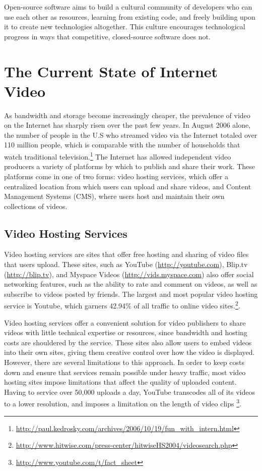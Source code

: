 \documentclass[a4paper,12pt]{report}
\begin{document}
Open-source software aims to build a cultural community of developers who can use each other as resources, learning from existing code, and freely building upon it to create new technologies altogether.
This culture encourages technological progress in ways that competitive, closed-source software does not. 

\section{The Current State of Internet Video}
As bandwidth and storage become increasingly cheaper, the prevalence of video on the Internet has sharply risen over the past few years. 
In August 2006 alone, the number of people in the U.S who streamed video 
via the Internet totaled over 110 million people, which is comparable 
with the number of households that watch traditional television.\footnote{\url{http://paul.kedrosky.com/archives/2006/10/19/fun\_with\_intern.html}}
The Internet has allowed independent video producers a variety of platforms by which to publish and share their work. These platforms come 
in one of two forms: video hosting services, which offer a centralized location from which users can upload and share videos, and Content Management Systems (CMS), where users host and maintain their own collections of videos.

\subsection{Video Hosting Services}
Video hosting services are sites that offer free hosting and sharing of video files that users upload.
These sites, such as YouTube (\url{http://youtube.com}), Blip.tv (\url{http://blip.tv}), and Myspace Videos (\url{http://vids.myspace.com}) also offer social networking features, such as the ability to rate and comment on videos, as well as subscribe to videos posted by friends.
The largest and most popular video hosting service is Youtube, which garners 42.94\% of all traffic to online video sites.\footnote{\url{http://www.hitwise.com/press-center/hitwiseHS2004/videosearch.php}}. 

Video hosting services offer a convenient solution for video publishers 
to share videos with little technical expertise or resources, since bandwidth and hosting costs are shouldered by the service. These sites also allow users to embed videos into their own sites, giving them creative control over how the video is displayed. However, there are several limitations to this approach. In order to keep costs down and ensure that services remain possible under heavy traffic, most video hosting sites impose limitations that affect the quality of uploaded content. Having to service over 50,000 uploads a day, YouTube transcodes all of its videos to a lower resolution, and imposes a limitation on the length of video clips \footnote{\url{http://www.youtube.com/t/fact\_sheet}}. 
\end{document}
